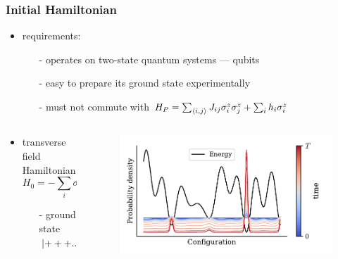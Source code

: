 \documentclass[11pt]{beamer}
\newcommand{\itemb}{\item[$\bullet$]}
\begin{document}
\begin{frame}
    \frametitle{Initial Hamiltonian}   
    \begin{itemize}
        \setlength{\itemindent}{-1em}
        \itemb requirements:
        \begin{itemize}
            \setlength{\itemindent}{-1em}
            \item [-] operates on two-state quantum systems --- qubits
            \item [-] easy to prepare its ground state experimentally
            \item [-] must not commute with $H_P = \sum_{\expval{i,j}} J_{ij} \sigma_i^z \sigma_j^z + \sum_i h_i \sigma_i^z$
        \end{itemize}
    \end{itemize} 

    \begin{columns}[T]
        \begin{column}{0.5\textwidth}
            \begin{itemize}
                \vspace*{1em}
                \itemb transverse field Hamiltonian 
                $$H_0 = - \sum_i \sigma_i^x$$
                \vspace*{-1.5em}
                \begin{itemize}
                    \item [-] ground state \\ \vspace*{0.5em} $\ket*{+++...} = \Pi_i^N \frac{\ket*{0}_i + \ket*{1}_i}{\sqrt{2}}$
                \end{itemize}
            \end{itemize}
        \end{column}
        \begin{column}{0.5\textwidth}
            \begin{figure}[!htb]
                \centering
                \includegraphics[width=\textwidth]{../plots/QA.pdf}
            \end{figure}
        \end{column}
    \end{columns}
\end{frame}
\end{document}
